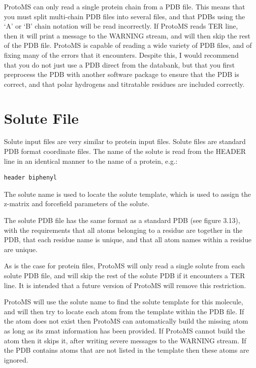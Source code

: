\documentclass[letterpaper,10pt,english]{sphinxmanual}
\begin{document}
ProtoMS can only read a single protein chain from a PDB file. This means that you must split multi-chain PDB files into several files, and that PDBs using the ‘A’ or ‘B’ chain notation will be read incorrectly. If ProtoMS reads TER line, then it will print a message to the WARNING stream, and will then skip the rest of the PDB file. ProtoMS is capable of reading a wide variety of PDB files, and of fixing many of the errors that it encounters. Despite this, I would recommend that you do not just use a PDB direct from the databank, but that you first preprocess the PDB with another software package to ensure that the PDB is correct, and that polar hydrogens and titratable residues are included correctly.


\section{Solute File}
\label{protoms:solute-file}
Solute input files are very similar to protein input files. Solute files are standard PDB format coordinate files. The name of the solute is read from the HEADER line in an identical manner to the name of a protein, e.g.:

\begin{Verbatim}[commandchars=\\\{\}]
header biphenyl
\end{Verbatim}

The solute name is used to locate the solute template, which is used to assign the z-matrix and forcefield parameters of the solute.

The solute PDB file has the same format as a standard PDB (see figure 3.13), with the requirements that all atoms belonging to a residue are together in the PDB, that each residue name is unique, and that all atom names within a residue are unique.

As is the case for protein files, ProtoMS will only read a single solute from each solute PDB file, and will skip the rest of the solute PDB if it encounters a TER line. It is intended that a future version of ProtoMS will remove this restriction.

ProtoMS will use the solute name to find the solute template for this molecule, and will then try to locate each atom from the template within the PDB file. If the atom does not exist then ProtoMS can automatically build the missing atom as long as its zmat information has been provided. If ProtoMS cannot build the atom then it skips it, after writing severe messages to the WARNING stream. If the PDB contains atoms that are not listed in the template then these atoms are ignored.
\end{document}
